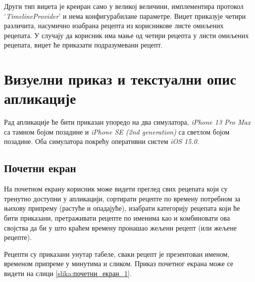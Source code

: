 \documentclass[12pt,oneside]{memoir}
\begin{document}
Други тип виџета је креиран само у великој величини, имплементира протокол '\textit{TimelineProvider}' и нема конфигурабилане параметре. Виџет приказује четири различита, насумично изабрана рецепта из корисникове листе омиљених рецепата. У случају да корисник има мање од четири рецепта у листи омиљених рецепата, виџет ће приказати подразумевани рецепт.

\section{Визуелни приказ и текстуални опис апликације}

\indent Рад апликације ће бити приказан упоредо на два симулатора, \textit{iPhone 13 Pro Max} са тамном бојом позадине и \textit{iPhone SE (2nd generation)} са светлом бојом позадине. Оба симулатора покрећу оперативни систем \textit{iOS 15.0}.

\subsection{Почетни екран}

\indent На почетном екрану корисник може видети преглед свих рецепата који су тренутно доступни у апликацији, сортирати рецепте по времену потребном за њихову припрему (растуће и опадајуће), изабрати категорију рецепата који ће бити приказани, претраживати рецепте по именима као и комбиновати ова својства да би у што краћем времену пронашао жељени рецепт (или жељене рецепте).

\indent Рецепти су приказани унутар табеле, сваки рецепт је презентован именом, временом припреме у минутима и сликом. Приказ почетног екрана може се видети на слици \ref{slika:почетни_екран_1}.
\end{document}
